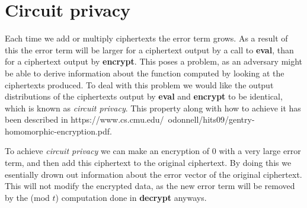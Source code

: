 \documentclass[11pt]{article}
\begin{document}
\section*{Circuit privacy}
Each time we add or multiply ciphertexts the error term grows.
As a result of this the error term will be larger for a ciphertext output by a call to \textbf{eval}, than for a ciphertext output by \textbf{encrypt}.
This poses a problem, as an adversary might be able to derive information about the function computed by looking at the ciphertexts produced.
To deal with this problem we would like the output distributions of the ciphertexts output by \textbf{eval} and \textbf{encrypt} to be identical, which is known as \textit{circuit privacy}.
This property along with how to achieve it has been described in https://www.cs.cmu.edu/~odonnell/hits09/gentry-homomorphic-encryption.pdf. %

To achieve \textit{circuit privacy} we can make an encryption of $0$ with a very large error term, and then add this ciphertext to the original ciphertext.
By doing this we esentially drown out information about the error vector of the original ciphertext.
This will not modify the encrypted data, as the new error term will be removed by the (mod $t$) computation done in \textbf{decrypt} anyways.
\end{document}
